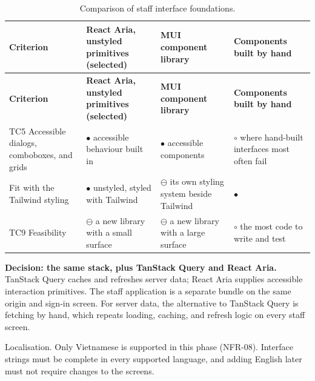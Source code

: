 {\small
\begin{longtable}{|>{\raggedright\arraybackslash}p{}|>{\raggedright\arraybackslash}p{}|>{\raggedright\arraybackslash}p{}|>{\raggedright\arraybackslash}p{}|}
\caption{Comparison of staff interface foundations.} \\
\hline
\textbf{Criterion} & \textbf{React Aria, unstyled primitives (selected)\cite{r146}} & \textbf{MUI component library\cite{r177}} & \textbf{Components built by hand} \\ \hline
\endfirsthead
\hline
\textbf{Criterion} & \textbf{React Aria, unstyled primitives (selected)\cite{r146}} & \textbf{MUI component library\cite{r177}} & \textbf{Components built by hand} \\ \hline
\endhead
TC5 Accessible dialogs, comboboxes, and grids & $\bullet$ accessible behaviour built in & $\bullet$ accessible components & $\circ$ where hand-built interfaces most often fail \\ \hline
Fit with the Tailwind styling & $\bullet$ unstyled, styled with Tailwind & $\ominus$ its own styling system beside Tailwind & $\bullet$ \\ \hline
TC9 Feasibility & $\ominus$ a new library with a small surface & $\ominus$ a new library with a large surface & $\circ$ the most code to write and test \\ \hline
\end{longtable}
}

\textbf{Decision: the same stack, plus TanStack Query and React Aria.} TanStack Query caches and refreshes server data\cite{r145}; React Aria supplies accessible interaction primitives\cite{r146}. The staff application is a separate bundle on the same origin and sign-in screen. For server data, the alternative to TanStack Query is fetching by hand, which repeats loading, caching, and refresh logic on every staff screen.

Localisation. Only Vietnamese is supported in this phase (NFR-08). Interface strings must be complete in every supported language, and adding English later must not require changes to the screens.

